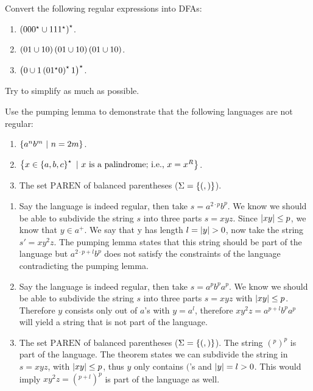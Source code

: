 \documentclass{article}
\begin{document}
\begin{exercise}
Convert the following regular expressions into DFAs:
\begin{enumerate}
 \item $\left( 000^{\star}\cup 111^{\star} \right)^{\star}$.
 \item $\left( 01\cup 10 \right)\left( 01\cup 10 \right)\left( 01\cup 10 \right)$.
 \item $\left( 0\cup 1\left( 01^{\star}0 \right)^{\star}1 \right)^{\star}$.
\end{enumerate}
Try to simplify as much as possible.
\begin{answer}
\end{answer}
\end{exercise}
\begin{exercise}
Use the pumping lemma to demonstrate that the following languages are not regular:
\begin{enumerate}
 \item $\left\{ a^nb^m\ |\ n = 2m \right\}$.
 \item $\left\{ x\in\left\{ a,b,c \right\}^{\star}\ |\ \mbox{$x$ is a palindrome; i.e., $x=x^R$} \right\}$.
 \item The set $\mbox{PAREN}$ of balanced parentheses ($\Sigma=\left\{ (,) \right\}$).
\end{enumerate}
\begin{answer}
\begin{enumerate}
 \item Say the language is indeed regular, then take $s=a^{2\cdot p}b^p$. We know we should be able to subdivide the string $s$ into three parts $s=xyz$. Since $\left|xy\right|\leq p$, we know that $y\in a^+$. We say that y has length $l=\abs{y}>0$, now take the string $s'=xy^2z$. The pumping lemma states that this string should be part of the language but $a^{2\cdot p+l}b^p$ does not satisfy the constraints of the language contradicting the pumping lemma.
 \item Say the language is indeed regular, then take $s=a^pb^pa^p$. We know we should be able to subdivide the string $s$ into three parts $s=xyz$ with $\left|xy\right|\leq p$. Therefore $y$ consists only out of $a$'s with $y=a^l$, therefore $xy^2z=a^{p+l}b^pa^p$ will yield a string that is not part of the language.
 \item The set $\mbox{PAREN}$ of balanced parentheses ($\Sigma=\left\{ (,) \right\}$). The string $(^p)^p$ is part of the language. The theorem states we can subdivide the string in $s=xyz$, with $\left|xy\right|\leq p$, thus $y$ only contains $($'s and $\left|y\right|=l>0$. This would imply $xy^2z=(^{p+l})^{p}$ is part of the language as well.
\end{enumerate}
\end{answer}
\end{exercise}
\end{document}
